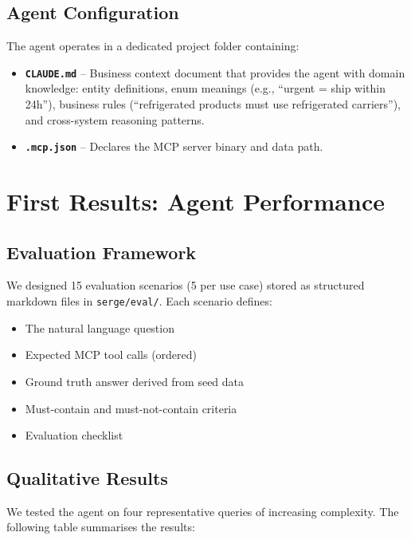 \documentclass[11pt,a4paper]{article}
\begin{document}
\subsection{Agent Configuration}

The agent operates in a dedicated project folder containing:

\begin{itemize}[itemsep=0.3em]
    \item \textbf{\texttt{CLAUDE.md}} -- Business context document that provides the agent with domain knowledge: entity definitions, enum meanings (e.g., ``urgent = ship within 24h''), business rules (``refrigerated products must use refrigerated carriers''), and cross-system reasoning patterns.
    \item \textbf{\texttt{.mcp.json}} -- Declares the MCP server binary and data path.
\end{itemize}

\section{First Results: Agent Performance}

\subsection{Evaluation Framework}

We designed 15 evaluation scenarios (5 per use case) stored as structured markdown files in \texttt{serge/eval/}. Each scenario defines:

\begin{itemize}[itemsep=0.2em]
    \item The natural language question
    \item Expected MCP tool calls (ordered)
    \item Ground truth answer derived from seed data
    \item Must-contain and must-not-contain criteria
    \item Evaluation checklist
\end{itemize}

\subsection{Qualitative Results}

We tested the agent on four representative queries of increasing complexity. The following table summarises the results:
\end{document}
